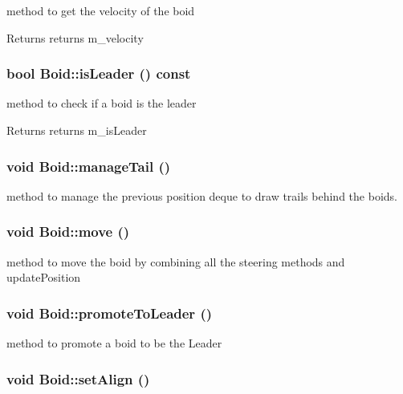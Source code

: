 method to get the velocity of the boid \begin{DoxyReturn}{Returns}
returns m\_\-velocity 
\end{DoxyReturn}
\hypertarget{classBoid_ae1abb7207513db480e1c84a3f1e95f7a}{
\subsubsection[{isLeader}]{\setlength{\rightskip}{0pt plus 5cm}bool Boid::isLeader () const}}
\label{classBoid_ae1abb7207513db480e1c84a3f1e95f7a}


method to check if a boid is the leader \begin{DoxyReturn}{Returns}
returns m\_\-isLeader 
\end{DoxyReturn}
\hypertarget{classBoid_a16b7b70d5ab275ce479d04f33f5bc1b4}{
\subsubsection[{manageTail}]{\setlength{\rightskip}{0pt plus 5cm}void Boid::manageTail ()}}
\label{classBoid_a16b7b70d5ab275ce479d04f33f5bc1b4}


method to manage the previous position deque to draw trails behind the boids. \hypertarget{classBoid_ad84ed9152d035b542921547f289024eb}{
\subsubsection[{move}]{\setlength{\rightskip}{0pt plus 5cm}void Boid::move ()}}
\label{classBoid_ad84ed9152d035b542921547f289024eb}


method to move the boid by combining all the steering methods and updatePosition \hypertarget{classBoid_af9b67d9a80f8c04b781245fed2d04c82}{
\subsubsection[{promoteToLeader}]{\setlength{\rightskip}{0pt plus 5cm}void Boid::promoteToLeader ()}}
\label{classBoid_af9b67d9a80f8c04b781245fed2d04c82}


method to promote a boid to be the Leader \hypertarget{classBoid_a0c9548700985d099f552c0f4de7bb108}{
\subsubsection[{setAlign}]{\setlength{\rightskip}{0pt plus 5cm}void Boid::setAlign ()}}
\label{classBoid_a0c9548700985d099f552c0f4de7bb108}


